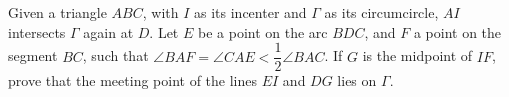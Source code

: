 Given a triangle $ABC$,  with $I$ as its incenter and $\Gamma$ as its circumcircle, $AI$ intersects $\Gamma$ again at $D$. Let $E$ be a point on the arc $BDC$,  and $F$ a point on the segment $BC$,  such that $\angle BAF=\angle CAE < \dfrac12\angle BAC$. If $G$ is the midpoint of $IF$,  prove that the meeting point of the lines $EI$ and $DG$ lies on $\Gamma$.